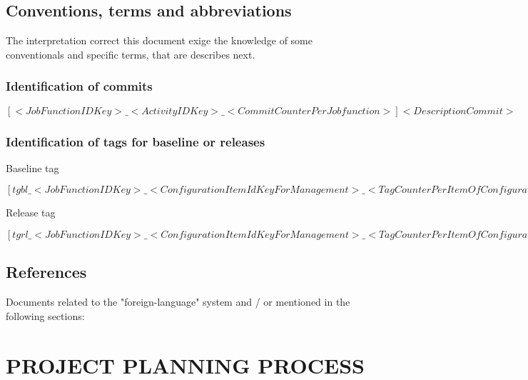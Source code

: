 \documentclass[11pt, twoside, a4paper]{book}
\begin{document}
            \section{Conventions, terms and abbreviations}
                
                The interpretation correct this document exige the knowledge of some conventionals and specific terms, that are describes next.	                
                
                \subsection{Identification of commits}
                
                	\begin{center}
                		$[<Job Function ID Key>\_<Activity ID Key>\_<Commit Counter Per Job function>] <Description Commit>$
                	\end{center}
                
                \subsection{Identification of tags for baseline or releases}

					\begin{center}
						Baseline tag													

            			$[tgbl\_<Job Function ID Key>\_<Configuration Item Id Key For Management>\_<Tag Counter Per Item Of Configuration>]$
					\end{center}					                			

        			\begin{center}
		   				Release tag					        			
        			
            			$[tgrl\_<Job Function ID Key>\_<Configuration Item Id Key For Management>\_<Tag Counter Per Item Of Configuration>]	$	
					\end{center}					                
					
            \section{References}
                    
                    Documents related to the "foreign-language" system and / or mentioned in the following sections:
            
        \chapter{PROJECT PLANNING PROCESS}
        
\end{document}
